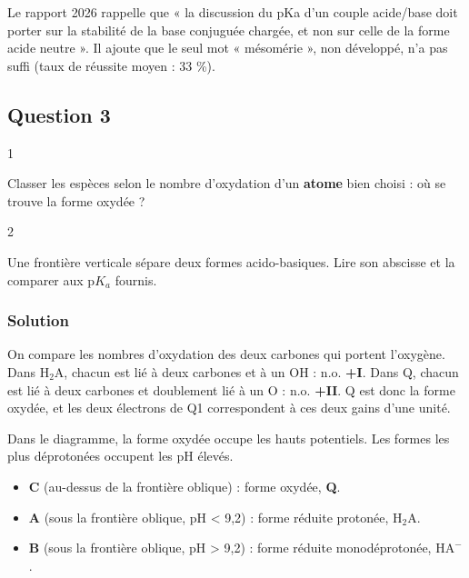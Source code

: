 \documentclass[11pt,a4paper]{article}
\providecommand{\tightlist}{\setlength{\itemsep}{0pt}\setlength{\parskip}{0pt}}
\begin{document}
\begin{jury}

Le rapport 2026 rappelle que « la discussion du pKa d'un couple acide/base doit porter sur la stabilité de la base conjuguée chargée, et non sur celle de la forme acide neutre ». Il ajoute que le seul mot « mésomérie », non développé, n'a pas suffi (taux de réussite moyen : 33 \%).

\end{jury}

\hypertarget{question-3}{%
\subsection{Question 3}\label{question-3}}

\begin{indication}{1}

Classer les espèces selon le nombre d'oxydation d'un \textbf{atome} bien choisi : où se trouve la forme oxydée ?

\end{indication}

\begin{indication}{2}

Une frontière verticale sépare deux formes acido-basiques. Lire son abscisse et la comparer aux p\(K_a\) fournis.

\end{indication}

\hypertarget{solution-2}{%
\subsubsection{Solution}\label{solution-2}}

On compare les nombres d'oxydation des deux carbones qui portent l'oxygène. Dans \(\mathrm{H_2A}\), chacun est lié à deux carbones et à un OH : n.o. \textbf{+I}. Dans Q, chacun est lié à deux carbones et doublement lié à un O : n.o. \textbf{+II}. Q est donc la forme oxydée, et les deux électrons de Q1 correspondent à ces deux gains d'une unité.

Dans le diagramme, la forme oxydée occupe les hauts potentiels. Les formes les plus déprotonées occupent les pH élevés.

\begin{itemize}
\tightlist
\item
  \textbf{C} (au-dessus de la frontière oblique) : forme oxydée, \textbf{Q}.
\item
  \textbf{A} (sous la frontière oblique, pH \textless{} 9,2) : forme réduite protonée, \textbf{\(\mathrm{H_2A}\)}.
\item
  \textbf{B} (sous la frontière oblique, pH \textgreater{} 9,2) : forme réduite monodéprotonée, \textbf{\(\mathrm{HA^-}\)}.
\end{itemize}
\end{document}
